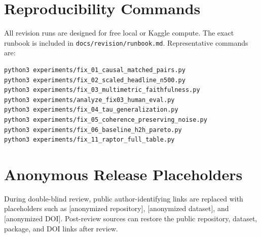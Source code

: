 \section{Reproducibility Commands}
\label{app:commands}

All revision runs are designed for free local or Kaggle compute. The exact
runbook is included in \verb|docs/revision/runbook.md|. Representative
commands are:

\begin{verbatim}
python3 experiments/fix_01_causal_matched_pairs.py
python3 experiments/fix_02_scaled_headline_n500.py
python3 experiments/fix_03_multimetric_faithfulness.py
python3 experiments/analyze_fix03_human_eval.py
python3 experiments/fix_04_tau_generalization.py
python3 experiments/fix_05_coherence_preserving_noise.py
python3 experiments/fix_06_baseline_h2h_pareto.py
python3 experiments/fix_11_raptor_full_table.py
\end{verbatim}

\section{Anonymous Release Placeholders}
\label{app:release}

During double-blind review, public author-identifying links are replaced with
placeholders such as [anonymized repository], [anonymized dataset], and
[anonymized DOI]. Post-review sources can restore the public repository,
dataset, package, and DOI links after review.
